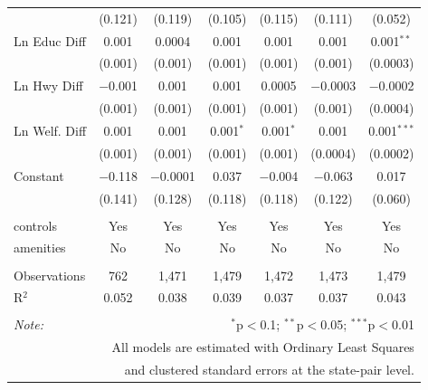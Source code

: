 \begin{table}[!htbp]
\begin{tabular}{@{\extracolsep{5pt}}lcccccc}
  & (0.121) & (0.119) & (0.105) & (0.115) & (0.111) & (0.052) \\ 
  Ln Educ Diff & 0.001 & 0.0004 & 0.001 & 0.001 & 0.001 & 0.001$^{**}$ \\ 
  & (0.001) & (0.001) & (0.001) & (0.001) & (0.001) & (0.0003) \\ 
  Ln Hwy Diff & $-$0.001 & 0.001 & 0.001 & 0.0005 & $-$0.0003 & $-$0.0002 \\ 
  & (0.001) & (0.001) & (0.001) & (0.001) & (0.001) & (0.0004) \\ 
  Ln Welf. Diff & 0.001 & 0.001 & 0.001$^{*}$ & 0.001$^{*}$ & 0.001 & 0.001$^{***}$ \\ 
  & (0.001) & (0.001) & (0.001) & (0.001) & (0.0004) & (0.0002) \\ 
  Constant & $-$0.118 & $-$0.0001 & 0.037 & $-$0.004 & $-$0.063 & 0.017 \\ 
  & (0.141) & (0.128) & (0.118) & (0.118) & (0.122) & (0.060) \\ 
 \hline \\[-1.8ex] 
controls & Yes & Yes & Yes & Yes & Yes & Yes \\ 
amenities & No & No & No & No & No & No \\ 
\hline \\[-1.8ex] 
Observations & 762 & 1,471 & 1,479 & 1,472 & 1,473 & 1,479 \\ 
R$^{2}$ & 0.052 & 0.038 & 0.039 & 0.037 & 0.037 & 0.043 \\ 
\hline 
\hline \\[-1.8ex] 
\textit{Note:}  & \multicolumn{6}{r}{$^{*}$p$<$0.1; $^{**}$p$<$0.05; $^{***}$p$<$0.01} \\ 
 & \multicolumn{6}{r}{All models are estimated with Ordinary Least Squares} \\ 
 & \multicolumn{6}{r}{and clustered standard errors at the state-pair level.} \\ 
\end{tabular} 
\end{table} 
